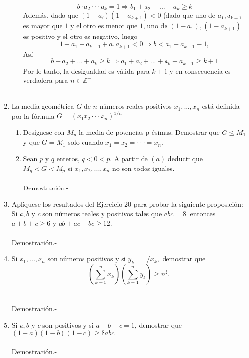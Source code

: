 \begin{enumerate}
\begin{enumerate}[C1]
$$b\cdot a_2 \cdot \cdot \cdot a_k = 1 \Rightarrow b_1 + a_2 + ... - a_k \geq k$$
Además, dado que $(1-a_i)(1-a_{k+1})<0$ (dado que uno de $a_1, a_{k+1}$ es mayor que $1$ y el otro es menor que $1$, uno de $(1-a_1), (1-a_{k+1})$ es positivo y el otro es negativo, luego $$1-a_1-a_{k+1}+a_1a_{k+1}<0 \Rightarrow b<a_1 + a_{k+1}-1,$$
Así
$$b+a_2+...+a_k\geq k \Rightarrow a_1 + a_2 +...+a_k + a_{k+1} \geq k+1$$
Por lo tanto, la desigualdad es válida para $k+1$ y en consecuencia es verdadera para $n\in \mathbb{Z}^+$\\\\
\end{enumerate}

\item 
\begin{tcolorbox}[colback = white]
\begin{def.}
La media geométrica $G$ de $n$ números reales positivos $x_1,...,x_n$ está definida por la fórmula $G=(x_1 x_2 \cdot \cdot \cdot x_n)^{1/n}$
\end{def.}
\end{tcolorbox}
\begin{enumerate}[\bfseries (a)]
\item Desígnese con $M_p$ la media de potencias p-ésimas. Demostrar que $G \leq M_1$ y que $G=M_1$ solo cuando $x_1 = x_2 = \cdot \cdot \cdot = x_n.$
\item Sean $p$ y $q$ enteros, $q<0<p$. A partir de $(a)$ deducir que $M_q< G < M_p$ si $x_1,x_2,...,x_n$ no son todos iguales.\\\\
Demostración.- \; 
\end{enumerate}

\item Aplíquese los resultados del Ejercicio 20 para probar la siguiente proposición: Si $a,b$ y $c$ son números reales y positivos tales que $abc=8$, entonces $a+b+c \geq 6$ y $ab +ac +bc \geq 12.$\\\\
Demostración.- \;

\item Si $x_1,...,x_n$ son números positivos y si $y_k = 1/x_k,$ demostrar que $$\displaystyle \left( \sum_{k=1}^n x_k \right) \left( \sum_{k=1}^n y_k \right) \geq n^2.$$\\\\
Demostración.- \; 

\item Si $a,b$ y $c$ son positivos y si $a+b+c =1$, demostrar que $(1-a)(1-b)(1-c)\geq 8abc$\\\\
Demostración.- \; 
\end{enumerate}




